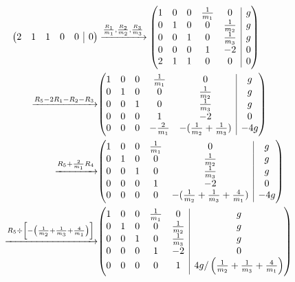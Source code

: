 \documentclass[11pt]{article}
\makeatletter
\newenvironment{amatrix}[1]{%
	\left(\begin{array}{@{}*{#1}{c} | c@{}}
	}{%
	\end{array}\right)
}						%
\makeatother
\begin{document}
\begin{appendices}
\begin{align*}
\begin{amatrix}{5}
			2 & 1 & 1 & 0 & 0 & 0			
			\end{amatrix}
			&\xrightarrow[]{\frac{R_1}{m_1}, \frac{R_2}{m_2}, \frac{R_3}{m_3}}
			\begin{amatrix}{5}
			1 & 0 & 0 & \frac{1}{m_1} & 0 & g \\  
			0 & 1 & 0 & 0 & \frac{1}{m_2} & g \\
			0 & 0 & 1 & 0 & \frac{1}{m_3} & g \\
			0 & 0 & 0 & 1 & -2 & 0 \\
			2 & 1 & 1 & 0 & 0 & 0			
			\end{amatrix} \\
			\xrightarrow[]{R_5 - 2R_1 - R_2 - R_3}
			&\begin{amatrix}{5}
			1 & 0 & 0 & \frac{1}{m_1} & 0 & g \\  
			0 & 1 & 0 & 0 & \frac{1}{m_2} & g \\
			0 & 0 & 1 & 0 & \frac{1}{m_3} & g \\
			0 & 0 & 0 & 1 & -2 & 0 \\
			0 & 0 & 0 & -\frac{2}{m_1} & -(\frac{1}{m_2} + \frac{1}{m_3}) & -4g			
			\end{amatrix} \\
			\xrightarrow[]{R_5 + \frac{2}{m_1} R_4}
			&\begin{amatrix}{5}
			1 & 0 & 0 & \frac{1}{m_1} & 0 & g \\  
			0 & 1 & 0 & 0 & \frac{1}{m_2} & g \\
			0 & 0 & 1 & 0 & \frac{1}{m_3} & g \\
			0 & 0 & 0 & 1 & -2 & 0 \\
			0 & 0 & 0 & 0 & -(\frac{1}{m_2} + \frac{1}{m_3} + \frac{4}{m_1}) & -4g			
			\end{amatrix} \\
			\xrightarrow[]{R_5 \div \left[-\left(\frac{1}{m_2} + \frac{1}{m_3} + \frac{4}{m_1}\right)\right]}
			&\begin{amatrix}{5}
			1 & 0 & 0 & \frac{1}{m_1} & 0 & g \\  
			0 & 1 & 0 & 0 & \frac{1}{m_2} & g \\
			0 & 0 & 1 & 0 & \frac{1}{m_3} & g \\
			0 & 0 & 0 & 1 & -2 & 0 \\
			0 & 0 & 0 & 0 & 1 & 4g/\left(\frac{1}{m_2} + \frac{1}{m_3} + \frac{4}{m_1}\right)
			\end{amatrix}
		\end{align*}
		\vspace{-2cm}
		\begin{align*}

\end{align*}
\end{appendices}
\end{document}
